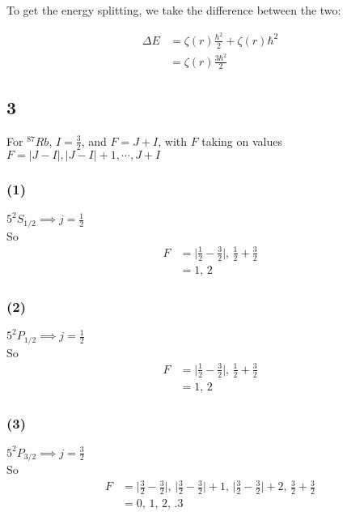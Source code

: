\documentclass[12pt]{article}
\begin{document}
To get the energy splitting, we take the difference between the two:

$$
\begin{align*}
\Delta E &= \zeta(r) \frac{\hbar^2}{2} + \zeta(r) \hbar^2\\
&= \zeta(r) \frac{3 \hbar^2}{2}
\end{align*}
$$

\subsection*{3}

For ${}^{87}Rb$, $I = \frac{3}{2}$, and $F = J+I$, with $F$ taking on values $F = \rvert J - I \rvert, \rvert J - I \rvert + 1, \cdots , J + I$

\subsubsection*{(1)}

$5^2S_{1/2} \implies j = \frac{1}{2}$ \\
So
$$
\begin{align*}
F &= \rvert \frac{1}{2} - \frac{3}{2} \rvert,\, \frac{1}{2}+\frac{3}{2}\\
&= 1,\,2
\end{align*}
$$

\subsubsection*{(2)}

$5^2P_{1/2} \implies j = \frac{1}{2}$ \\
So
$$
\begin{align*}
F &= \rvert \frac{1}{2} - \frac{3}{2} \rvert,\, \frac{1}{2}+\frac{3}{2}\\
&= 1,\,2
\end{align*}
$$


\subsubsection*{(3)}

$5^2P_{3/2} \implies j = \frac{3}{2}$ \\
So
$$
\begin{align*}
F &= \rvert \frac{3}{2} - \frac{3}{2} \rvert,\, \rvert \frac{3}{2} - \frac{3}{2} \rvert + 1,\, \rvert \frac{3}{2} - \frac{3}{2} \rvert +2 ,\, \frac{3}{2}+\frac{3}{2}\\
&= 0,\,1,\,2,\,.3
\end{align*}
$$
\end{document}
